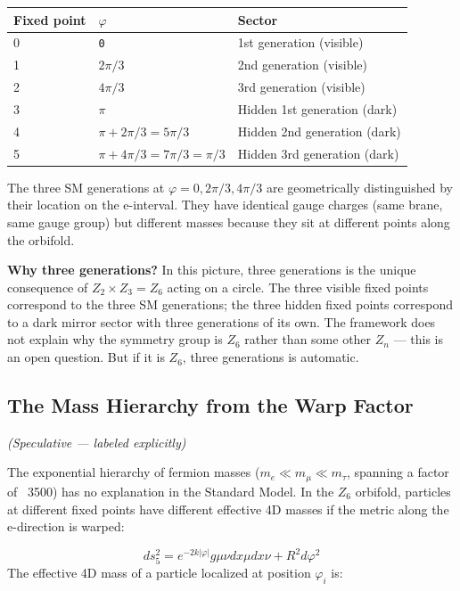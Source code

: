 \documentclass[aps,prd,preprint,superscriptaddress,longbibliography,floatfix]{revtex4-2}
\theoremstyle{remark}
\begin{document}
\begin{table}[H]
\begin{ruledtabular}
\begin{tabular}{p{5.0cm}p{5.0cm}p{5.0cm}}
Fixed point & $\varphi$ & Sector \\
\hline
0 & \texttt{0} & 1st generation (visible) \\
1 & $2\pi/3$ & 2nd generation (visible) \\
2 & $4\pi/3$ & 3rd generation (visible) \\
3 & $\pi$ & Hidden 1st generation (dark) \\
4 & $\pi + 2\pi/3 = 5\pi/3$ & Hidden 2nd generation (dark) \\
5 & $\pi + 4\pi/3 = 7\pi/3 = \pi/3$ & Hidden 3rd generation (dark) \\
\end{tabular}
\end{ruledtabular}
\end{table}

The three SM generations at $\varphi = 0, 2\pi/3, 4\pi/3$ are geometrically distinguished by their location on the e-interval. They have identical gauge charges (same brane, same gauge group) but different masses because they sit at different points along the orbifold.

\textbf{Why three generations?} In this picture, three generations is the unique consequence of $Z_{2} \times Z_{3} = Z_{6}$ acting on a circle. The three visible fixed points correspond to the three SM generations; the three hidden fixed points correspond to a dark mirror sector with three generations of its own. The framework does not explain why the symmetry group is $Z_{6}$ rather than some other $Z_{n}$ --- this is an open question. But if it is $Z_{6}$, three generations is automatic.



\subsection{The Mass Hierarchy from the Warp Factor}

\textit{(Speculative --- labeled explicitly)}

The exponential hierarchy of fermion masses ($m_e \ll m_\mu \ll m_\tau$, spanning a factor of ~3500) has no explanation in the Standard Model. In the $Z_{6}$ orbifold, particles at different fixed points have different effective 4D masses if the metric along the e-direction is warped:


\begin{equation}
    ds_{5}^{2} = e^{-2k|\varphi|} g\mu\nu dx\mu dx\nu + R^{2} d\varphi^{2}
\end{equation}
The effective 4D mass of a particle localized at position $\varphi_i$ is:
\end{document}
